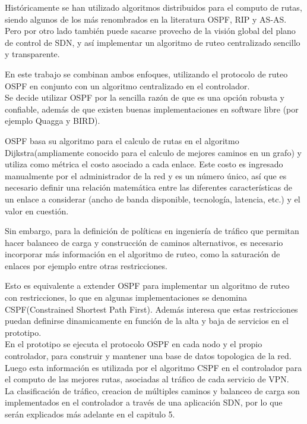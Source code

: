 Hist\'oricamente se han utilizado algoritmos distribuidos para el computo de rutas, siendo algunos de los m\'as renombrados en la literatura OSPF, RIP y AS-AS. Pero por otro lado también puede sacarse provecho de la visi\'on global del plano de control de SDN, y as\'i implementar un algoritmo de ruteo centralizado sencillo y transparente.

En este trabajo se combinan ambos enfoques, utilizando el protocolo de ruteo OSPF en conjunto con un algoritmo centralizado en el controlador.\\

Se decide utilizar OSPF por la sencilla razón de que es una opción robusta y confiable, adem\'as de que existen buenas implementaciones en software libre (por ejemplo Quagga\cite{Quagga} y BIRD\cite{BIRD}).

OSPF basa su algoritmo para el calculo de rutas en el algoritmo Dijkstra(ampliamente conocido para el calculo de mejores caminos en un grafo) y utiliza como m\'etrica el costo asociado a cada enlace. Este costo es ingresado manualmente por el administrador de la red y es un n\'umero \'unico, as\'i que es necesario definir una relaci\'on matem\'atica entre las diferentes caracter\'isticas de un enlace a considerar (ancho de banda disponible, tecnolog\'ia, latencia, etc.) y el valor en cuestión.

Sin embargo, para la definición de políticas en ingeniería de tr\'afico que permitan hacer balanceo de carga y construcción de caminos alternativos, es necesario incorporar m\'as informaci\'on en el algoritmo de ruteo, como la saturaci\'on de enlaces por ejemplo entre otras restricciones.

Esto es equivalente a extender OSPF para implementar un algoritmo de ruteo con restricciones, lo que en algunas implementaciones se denomina CSPF(Constrained Shortest Path First). Adem\'as interesa que estas restricciones puedan definirse dinamicamente en función de la alta y baja de servicios en el prototipo.\\

En el prototipo se ejecuta el protocolo OSPF en cada nodo y el propio controlador, para construir y mantener una base de datos topologica de la red. Luego esta información es utilizada por el algoritmo CSPF en el controlador para el computo de las mejores rutas, asociadas al tr\'afico de cada servicio de VPN.\\

La clasificaci\'on de tr\'afico, creacion de m\'ultiples caminos y balanceo de carga son implementados en el controlador a través de una aplicaci\'on SDN, por lo que ser\'an explicados m\'as adelante en el capitulo 5.

